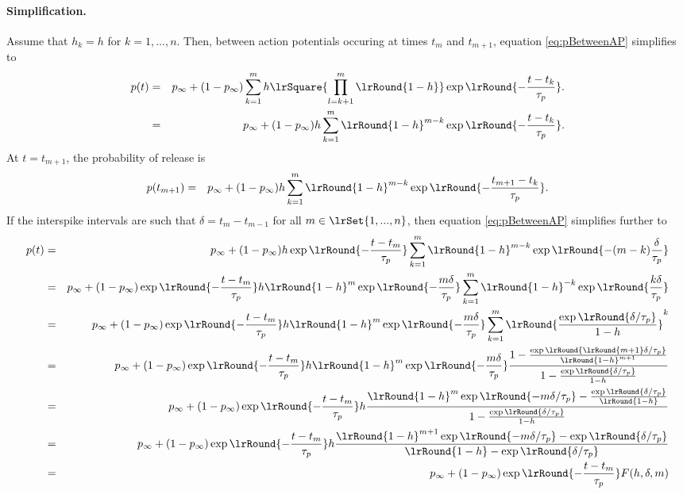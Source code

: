 \documentclass[11pt,landscape]{article}
\begin{document}
\paragraph{Simplification.} 
Assume that $h_k =h$ for
$k=1,...,n$.  Then, between action potentials occuring at times $t_m$
and $t_{m+1}$,  equation \eqref{eq:pBetweenAP} simplifies to
\begin{eqnarray}
p(t)
&=& 
p_{\infty} + (1-p_{\infty}) 
\sum_{k=1}^{m} 
h \lrSquare{
\prod_{l=k+1}^{m}  
\lrRound{1- h}} 
\exp \lrRound{-\frac{t-t_k}{\tau_p}}. 
\nonumber \\ 
&=& 
p_{\infty} + (1-p_{\infty}) 
h \sum_{k=1}^{m} 
\lrRound{1- h}^{m-k} 
\exp \lrRound{-\frac{t-t_k}{\tau_p}}. 
\end{eqnarray}
At $t=t_{m+1}$, the probability of release is
\begin{eqnarray}
p(t_{m+1})
&=&
p_{\infty} + (1-p_{\infty}) 
h \sum_{k=1}^{m} 
\lrRound{1- h}^{m-k} 
\exp \lrRound{-\frac{t_{m+1}-t_k}{\tau_p}}. 
\end{eqnarray}
If the interspike intervals are such that $\delta = t_{m} - t_{m-1}$
for all $m \in \lrSet{1,...,n}$, then  equation \eqref{eq:pBetweenAP}
simplifies further to
\begin{eqnarray}
p(t)
&=& 
p_{\infty} + (1-p_{\infty}) 
h \exp \lrRound{-\frac{t-t_{m}}{\tau_p}}
 \sum_{k=1}^{m} 
\lrRound{1- h}^{m-k} 
\exp \lrRound{-(m-k) \frac{\delta}{\tau_p}}
\nonumber \\
&=& 
p_{\infty} + (1-p_{\infty}) 
 \exp \lrRound{-\frac{t-t_{m}}{\tau_p}}
h \lrRound{1- h}^{m}
\exp \lrRound{- \frac{m \delta}{\tau_p}}
 \sum_{k=1}^{m} 
 \lrRound{1- h}^{-k} 
\exp \lrRound{\frac{k \delta}{\tau_p}}
\nonumber \\
&=& 
p_{\infty} + (1-p_{\infty}) 
 \exp \lrRound{-\frac{t-t_{m}}{\tau_p}}
h \lrRound{1- h}^{m}
\exp \lrRound{- \frac{m \delta}{\tau_p}}
 \sum_{k=1}^{m} \lrRound{
 \frac{\exp \lrRound{ \delta/ \tau_p}}
{1- h}}^{k}
\nonumber \\
&=& 
p_{\infty} + (1-p_{\infty}) 
 \exp \lrRound{-\frac{t-t_{m}}{\tau_p}}
h \lrRound{1- h}^{m}
\exp \lrRound{- \frac{m \delta}{\tau_p}}
\frac
{1 - \frac{\exp \lrRound{ \lrRound{m+1}\delta /\tau_p}}
{\lrRound{1- h}^{m+1}}}
{1- \frac{\exp \lrRound{ \delta/\tau_p}}
{1- h}}
\nonumber \\
&=& 
p_{\infty} + (1-p_{\infty}) 
 \exp \lrRound{-\frac{t-t_{m}}{\tau_p}}
h 
\frac
{ \lrRound{1- h}^{m}
\exp \lrRound{- m \delta / \tau_p}
- \frac
{\exp \lrRound{  \delta / \tau_p}}
{\lrRound{1- h}}
}
{1- \frac
{\exp \lrRound{ \delta / \tau_p}}
{1- h}
}
\nonumber \\
&=& 
p_{\infty} + (1-p_{\infty}) 
 \exp \lrRound{-\frac{t-t_{m}}{\tau_p}}
h 
\frac
{ \lrRound{1- h}^{m+1}
\exp \lrRound{- m \delta / \tau_p}
- {\exp \lrRound{  \delta / \tau_p}}
}
{\lrRound{1- h} - \exp \lrRound{ \delta / \tau_p}}
\nonumber \\
&=& 
p_{\infty} + (1-p_{\infty}) 
 \exp \lrRound{-\frac{t-t_{m}}{\tau_p}}
F(h,\delta,m)
\end{eqnarray}
\end{document}
